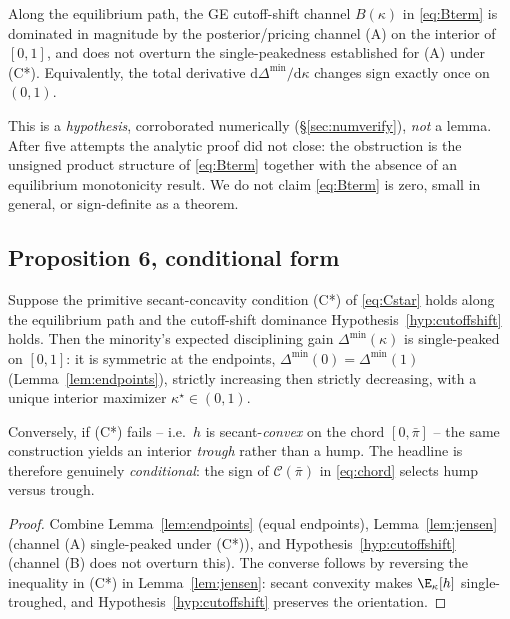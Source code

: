 \begin{hypothesis}
\label{hyp:cutoffshift}
Along the equilibrium path, the GE cutoff-shift channel $B(\kappa)$ in
\eqref{eq:Bterm} is dominated in magnitude by the posterior/pricing channel
(A) on the interior of $[0,1]$, and does not overturn the single-peakedness
established for (A) under (C*). Equivalently, the total derivative
$\mathrm{d}\Delta^{\min}/\mathrm{d}\kappa$ changes sign exactly once on $(0,1)$.
\end{hypothesis}

\begin{remark}
This is a \emph{hypothesis}, corroborated numerically (\S\ref{sec:numverify}),
\emph{not} a lemma. After five attempts the analytic proof did not close: the
obstruction is the unsigned product structure of \eqref{eq:Bterm} together with
the absence of an equilibrium monotonicity result. We do not claim
\eqref{eq:Bterm} is zero, small in general, or sign-definite as a theorem.
\end{remark}

\subsection*{Proposition 6, conditional form}

\begin{proposition}
\label{prop:hump}
Suppose the primitive secant-concavity condition (C*) of \eqref{eq:Cstar} holds
along the equilibrium path and the cutoff-shift dominance
Hypothesis~\ref{hyp:cutoffshift} holds. Then the minority's expected
disciplining gain $\Delta^{\min}(\kappa)$ is single-peaked on $[0,1]$: it is
symmetric at the endpoints, $\Delta^{\min}(0)=\Delta^{\min}(1)$
(Lemma~\ref{lem:endpoints}), strictly increasing then strictly decreasing, with
a unique interior maximizer $\kappa^\star\in(0,1)$.

Conversely, if (C*) fails -- i.e.\ $h$ is secant-\emph{convex} on the chord
$[0,\bar\pi]$ -- the same construction yields an interior \emph{trough} rather
than a hump. The headline is therefore genuinely \emph{conditional}: the sign of
$\mathcal{C}(\bar\pi)$ in \eqref{eq:chord} selects hump versus trough.
\end{proposition}

\begin{proof}
Combine Lemma~\ref{lem:endpoints} (equal endpoints),
Lemma~\ref{lem:jensen} (channel (A) single-peaked under (C*)), and
Hypothesis~\ref{hyp:cutoffshift} (channel (B) does not overturn this). The
converse follows by reversing the inequality in (C*) in Lemma~\ref{lem:jensen}:
secant convexity makes $\E_\kappa[h]$ single-troughed, and
Hypothesis~\ref{hyp:cutoffshift} preserves the orientation.
\end{proof}

